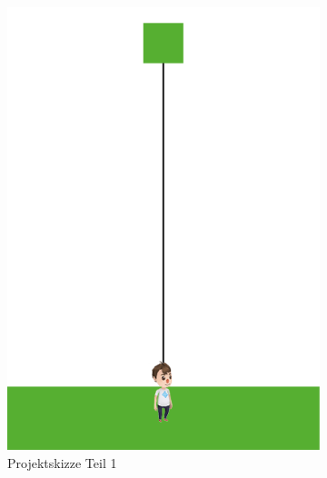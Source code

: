 \begin{figure}[H]
    \centering
    \begin{subfigure}[b]{0.3\textwidth}
        \includegraphics[width=\textwidth]{assets/skizze1.png}
        \caption{Projektskizze Teil 1}
        \label{fig:skizze1}
    \end{subfigure}
    ~
    \begin{subfigure}[b]{0.3\textwidth}

\end{subfigure}
\end{figure}
